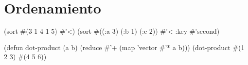 \section{Ordenamiento}
\begin{lispcode}
(sort #(3 1 4 1 5) #'<)
(sort #((:a 3) (:b 1) (:c 2)) #'< :key #'second)
\end{lispcode}

\begin{examplebox}[title=Producto escalar con reduce]
\begin{lispcode}
(defun dot-product (a b)
  (reduce #'+ (map 'vector #'* a b)))
(dot-product #(1 2 3) #(4 5 6))
\end{lispcode}
\end{examplebox}


